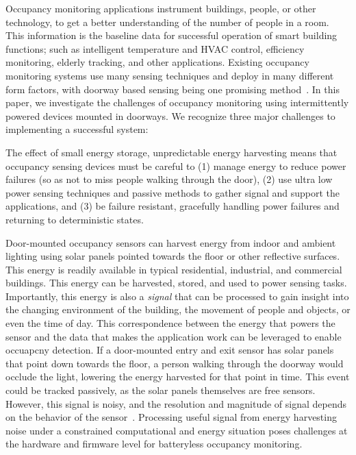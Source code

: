 Occupancy monitoring applications instrument buildings, people, or other technology, to get a better understanding of the number of people in a room.
This information is the baseline data for successful operation of smart building functions; such as intelligent temperature and HVAC control, efficiency monitoring, elderly tracking, and other applications.
Existing occupancy monitoring systems use many sensing techniques and deploy in many different form factors, with doorway based sensing being one promising  method~\cite{hnat2012doorjamb, sonicdoor-buildsys2017}.
In this paper, we investigate the challenges of occupancy monitoring using intermittently powered devices mounted in doorways.
We recognize three major challenges to implementing a successful system:

The effect of small energy storage, unpredictable energy harvesting means that occupancy sensing devices must be careful to (1) manage energy to reduce power failures (so as not to miss people walking through the door), (2) use ultra low power sensing techniques and passive methods to gather signal and support the applications, and (3) be failure resistant, gracefully handling power failures and returning to deterministic states.

Door-mounted occupancy sensors can harvest energy from indoor and ambient lighting using solar panels pointed towards the floor or other reflective surfaces.
This energy is readily available in typical residential, industrial, and commercial buildings.
This energy can be harvested, stored, and used to power sensing tasks.
Importantly, this energy is also a \textit{signal} that can be processed to gain insight into the changing environment of the building, the movement of people and objects, or even the time of day.
This correspondence between the energy that powers the sensor and the data that makes the application work can be leveraged to enable occuapcny detection.
If a door-mounted entry and exit sensor has solar panels that point down towards the floor, a person walking through the doorway would occlude the light, lowering the energy harvested for that point in time.
This event could be tracked passively, as the solar panels themselves are free sensors.
However, this signal is noisy, and the resolution and magnitude of signal depends on the behavior of the sensor~\cite{ekho-sensys}.
Processing useful signal from energy harvesting noise under a constrained computational and energy situation poses challenges at the hardware and firmware level for batteryless occupancy monitoring.

